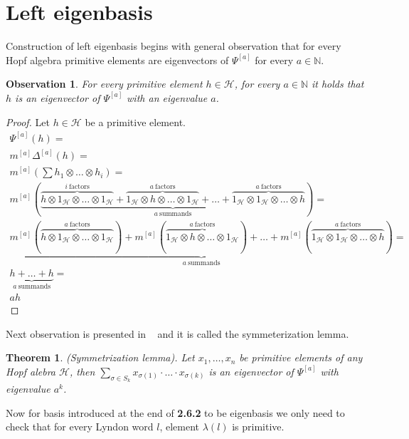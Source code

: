 \documentclass[a4paper, 12pt]{report}
\newtheorem{observation}{Observation}
\newtheorem{theorem}{Theorem}
\begin{document}
\section{Left eigenbasis}
Construction of left eigenbasis begins with general observation that for every Hopf algebra 
primitive elements are eigenvectors of $\Psi^{[a]}$ for every $a \in \mathbb{N}$. 
\begin{observation}
For every primitive element $h \in \mathcal{H}$, for every $a \in \mathbb{N}$ it holds that $h$ is an 
eigenvector of $\Psi^{[a]}$ with an eigenvalue $a$.
\end{observation}
\begin{proof}
Let $h \in \mathcal{H}$ be a primitive element.
\begin{gather*}
\Psi^{[a]}(h) = \\ m^{[a]}\Delta^{[a]}(h) = \\
m^{[a]}(\sum h_1 \otimes \dots \otimes h_i) = \\
m^{[a]}(\underbrace{\overbrace{h \otimes 1_\mathcal{H} \otimes \dots \otimes 1_\mathcal{H}}^{i\ 
\mathrm{factors}} + 
\overbrace{1_\mathcal{H} \otimes h \otimes \dots \otimes 1_\mathcal{H}}^{a\ \mathrm{factors}} +
\dots + 
\overbrace{1_\mathcal{H} \otimes 1_\mathcal{H} \otimes \dots \otimes h}^{a\ \mathrm{factors}}}_{a\ 
\mathrm{summands}} ) = \\
\underbrace{m^{[a]}(\overbrace{h \otimes 1_\mathcal{H} \otimes \dots \otimes 1_\mathcal{H}}^{a\ 
\mathrm{factors}}) + 
m^{[a]}(\overbrace{1_\mathcal{H} \otimes h \otimes \dots \otimes 1_\mathcal{H}}^{a\ \mathrm{factors}}) +
\dots + 
m^{[a]}(\overbrace{1_\mathcal{H} \otimes 1_\mathcal{H} \otimes \dots \otimes h}^{a\ \mathrm{factors}})}_{a\ 
\mathrm{summands}} = \\
\underbrace{h + \dots + h}_{a\ \mathrm{summands}} = \\
ah 
\end{gather*}

\end{proof}
Next observation is presented in ~\cite{Diaconis2014} and it is called the symmeterization lemma.
\begin{theorem}
(Symmetrization lemma). Let $x_1, \dots, x_n$ be primitive elements of any Hopf alebra $\mathcal{H}$, then 
$\displaystyle\sum_{\sigma \in S_k} x_{\sigma(1)}\cdot\ldots\cdot x_{\sigma(k)}$ is an eigenvector of 
$\Psi^{[a]}$ with eigenvalue $a^k$.
\end{theorem}

Now for basis introduced at the end of \textbf{2.6.2} to be eigenbasis we only need to check that for 
every Lyndon 
word $l$, element $\lambda(l)$ is primitive. 
\end{document}
